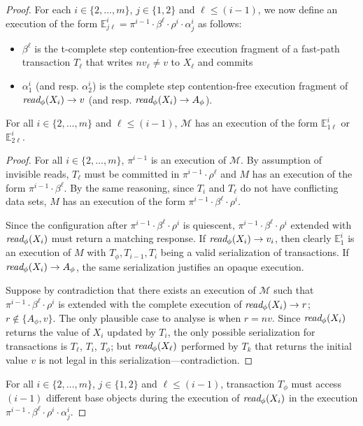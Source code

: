 \begin{proof}
For each $i\in \{2,\ldots, m\}$, $j\in \{1,2\}$ and $\ell \leq (i-1)$, 
we now define an execution of the form  $\mathbb{E}_{j\ell}^{i}=\pi^{i-1}\cdot \beta^{\ell}\cdot \rho^i \cdot \alpha_j^i$
as follows:
%
\begin{itemize}
\item
$\beta^{\ell}$ is the t-complete step contention-free execution fragment of a fast-path transaction $T_{\ell}$
that writes $nv_{\ell}\neq v$ to $X_{\ell}$ and commits
\item
$\alpha_1^i$ (and resp. $\alpha_2^i$) is the complete step contention-free execution fragment of 
$\textit{read}_{\phi}(X_i) \rightarrow v$ (and resp. $\textit{read}_{\phi}(X_i) \rightarrow A_{\phi}$).
\end{itemize}
%
\begin{claim}
\label{cl:ic2}
For all $i\in \{2,\ldots, m\}$ and $\ell \leq (i-1)$, $\mathcal{M}$ has an execution of the form $\mathbb{E}_{1\ell}^{i}$ or 
$\mathbb{E}_{2\ell}^{i}$.
\end{claim}
%
\begin{proof}
%
For all $i \in \{2,\ldots, m\}$, $\pi^{i-1}$
is an execution of $\mathcal{M}$.
By assumption of invisible reads, $T_{{\ell}}$ must be committed in $\pi^{i-1}\cdot \rho^{\ell}$
and $M$ has an execution of the form $\pi^{i-1}\cdot \beta^{\ell}$.
By the same reasoning, since $T_i$ and $T_{\ell}$ do not have conflicting data sets,
$M$ has an execution of the form $\pi^{i-1}\cdot\beta^{\ell}\cdot \rho^i$.

Since the configuration after $\pi^{i-1}\cdot\beta^{\ell}\cdot \rho^i$ is quiescent,
$\pi^{i-1}\cdot\beta^{\ell}\cdot \rho^i$ extended with $\textit{read}_{\phi}(X_i)$
must return a matching response.
If $\textit{read}_{\phi}(X_i) \rightarrow v_i$, then clearly $\mathbb{E}_{1}^{i}$
is an execution of $M$ with $T_{\phi}, T_{i-1}, T_i$ being a valid serialization
of transactions.
If $\textit{read}_{\phi}(X_i) \rightarrow A_{\phi}$, the same serialization
justifies an opaque execution.

Suppose by contradiction that there exists an execution of $\mathcal{M}$ such that
$\pi^{i-1}\cdot\beta^{\ell}\cdot \rho^i$ is extended with the complete execution
of $\textit{read}_{\phi}(X_i) \rightarrow r$; $r \not\in \{A_{\phi},v\}$. 
The only plausible case to analyse is when $r=nv$.
Since $\textit{read}_{\phi}(X_i)$ returns the value of $X_i$ updated by $T_i$, 
the only possible serialization for transactions is $T_{\ell}$, $T_i$, $T_{\phi}$; but $\textit{read}_{\phi}(X_{\ell})$
performed by $T_k$ that returns the initial value $v$
is not legal in this serialization---contradiction.
\end{proof}
%
%
For all $i\in \{2,\ldots, m\}$, $j\in \{1,2\}$ and $\ell \leq (i-1)$, transaction $T_{\phi}$ must access
$(i-1)$ different base objects during the execution of $\textit{read}_{\phi}(X_i)$ in the execution
$\pi^{i-1}\cdot \beta^{\ell}\cdot \rho^i \cdot \alpha_j^i$.


\end{proof}
